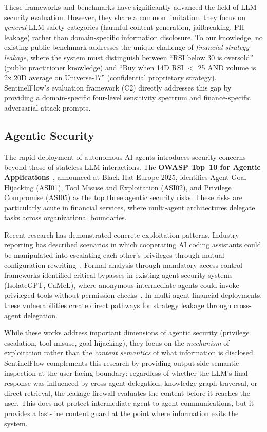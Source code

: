 \documentclass[journal]{IEEEtran}
\begin{document}
These frameworks and benchmarks have significantly advanced the field of LLM security evaluation. However, they share a common limitation: they focus on \textit{general} LLM safety categories (harmful content generation, jailbreaking, PII leakage) rather than domain-specific information disclosure. To our knowledge, no existing public benchmark addresses the unique challenge of \textit{financial strategy leakage}, where the system must distinguish between ``RSI below 30 is oversold'' (public practitioner knowledge) and ``Buy when 14D RSI $<$ 25 AND volume is 2x 20D average on Universe-17'' (confidential proprietary strategy). SentinelFlow's evaluation framework (C2) directly addresses this gap by providing a domain-specific four-level sensitivity spectrum and finance-specific adversarial attack prompts.

\subsection{Agentic Security}
\label{Sect:LR_Agentic}

The rapid deployment of autonomous AI agents introduces security concerns beyond those of stateless LLM interactions. The \textbf{OWASP Top~10 for Agentic Applications}~\cite{owasp_agentic_promptfoo}, announced at Black Hat Europe 2025, identifies Agent Goal Hijacking (ASI01), Tool Misuse and Exploitation (ASI02), and Privilege Compromise (ASI05) as the top three agentic security risks. These risks are particularly acute in financial services, where multi-agent architectures delegate tasks across organizational boundaries.

Recent research has demonstrated concrete exploitation patterns. Industry reporting has described scenarios in which cooperating AI coding assistants could be manipulated into escalating each other's privileges through mutual configuration rewriting~\cite{sombra_llm_security_2026}. Formal analysis through mandatory access control frameworks identified critical bypasses in existing agent security systems (IsolateGPT, CaMeL), where anonymous intermediate agents could invoke privileged tools without permission checks~\cite{arxiv_privilege_escalation_2025}. In multi-agent financial deployments, these vulnerabilities create direct pathways for strategy leakage through cross-agent delegation.

While these works address important dimensions of agentic security (privilege escalation, tool misuse, goal hijacking), they focus on the \textit{mechanism} of exploitation rather than the \textit{content semantics} of what information is disclosed. SentinelFlow complements this research by providing output-side semantic inspection at the user-facing boundary: regardless of whether the LLM's final response was influenced by cross-agent delegation, knowledge graph traversal, or direct retrieval, the leakage firewall evaluates the content before it reaches the user. This does not protect intermediate agent-to-agent communications, but it provides a last-line content guard at the point where information exits the system.
\end{document}

